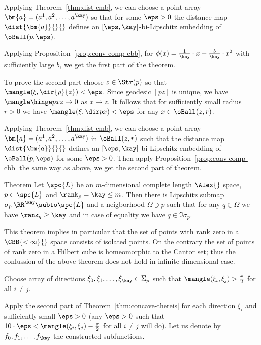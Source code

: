 Applying Theorem~\ref{thm:dist-emb},
we can choose a point array $\bm{a}=(a^1,a^2,\dots,a^\kay)$ so that for some $\eps>0$
the distance map $\dist{\bm{a}}{}{}$ defines an $[\eps,\kay]$-bi-Lipschitz embedding 
of $\oBall(p,\eps)$.

Applying Proposition~\ref{prop:conv-comp-cbb},
for $\phi(x)={\tfrac1\kay}\cdot x-\tfrac{b}{\kay}\cdot x^2$ 
with sufficiently large $b$, we get the first part of the theorem.

To prove the second part choose $z\in\Str(p)$ so that $\mangle(\xi, \dir{p}{z})<\eps$.
Since geodesic $[pz]$ is unique,
we have $\mangle\hinge pxz\to 0$ as $x\to z$.
It follows that for sufficiently small radius $r>0$
we have 
$\mangle(\xi,\dir px)<\eps$
for any $x\in\oBall(z,r)$.

Applying Theorem~\ref{thm:dist-emb}, we can choose a point array $\bm{a}=(a^1,a^2,\dots,a^\kay)$ in $\oBall(z,r)$ such that the distance map $\dist{\bm{a}}{}{}$ defines an $[\eps,\kay]$-bi-Lipschitz embedding 
of $\oBall(p,\eps)$ for some $\eps>0$.
Then apply Proposition~\ref{prop:conv-comp-cbb} the same way as above, we get the second part of theorem.
\qeds


\begin{thm}{Theorem}\label{thm:rank=kay}
Let $\spc{L}$ be an $m$-dimensional complete length $\Alex{}$ space,
$p\in\spc{L}$ and $\rank_p=\kay\le m$.
Then there is Lipschitz submap $\sigma_p\:\RR^\kay\subto\spc{L}$
and a neigborhood $\Omega\ni p$
such that for any $q\in\Omega$ we have 
$\rank_q\ge \kay$  
and in case of equality we have $q\in\Im \sigma_p$.
\end{thm}

This theorem implies in particular that the set of points with rank zero in a $\CBB{<\infty}{}$ space consists of isolated points. 
On the contrary the set of points of rank zero in a Hilbert cube %
is homeomorphic to the Cantor set;
thus the conlussion of the above theorem does not hold in infinite dimensional case.

Choose array of directions $\xi_0,\xi_1,\dots,\xi_\kay\in\Sigma_p$ 
such that $\mangle(\xi_i,\xi_j)>\tfrac\pi2$ for all $i\not=j$.

Apply the second part of Theorem~\ref{thm:concave-thereis} for each direction $\xi_i$ and sufficiently small $\eps>0$
(any $\eps>0$ such that $10\cdot\eps< \mangle(\xi_i,\xi_j)-\tfrac\pi2$ for all $i\not=j$ will do).
Let us denote by $f_0,f_1,\dots, f_\kay$ the constructed subfunctions.

